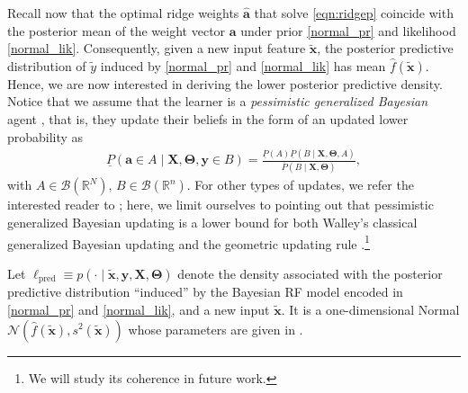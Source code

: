 \documentclass[12pt, english, oneside, a4paper]{article}
\newcommand{\y}{\boldsymbol{y}}
\newcommand{\X}{\boldsymbol{X}}
\newcommand{\x}{\boldsymbol{x}}
\renewcommand{\a}{\boldsymbol{a}}
\newcommand{\bT}{\boldsymbol{\Theta}}
\begin{document}
Recall now that the optimal ridge weights $\hat{\a}$ that solve \eqref{eqn:ridgep} coincide with the posterior mean of the weight vector $\a$ under prior \eqref{normal_pr} and likelihood \eqref{normal_lik}. Consequently, given a new input feature $\tilde{\x}$, the posterior predictive distribution of $\tilde{y}$ induced by \eqref{normal_pr} and \eqref{normal_lik} has mean $\hat f(\tilde{\x})$. Hence, we are now interested in deriving the lower posterior predictive density.
Notice that we assume that the learner is a {\em pessimistic generalized Bayesian} agent \citep[Theorem 6.4.6]{walley}, that is, they update their beliefs in the form of an updated lower probability as
\begin{align}\label{pessim-gen-bayes}
    \underline{P}(\a \in A \mid \X,\bT,\y\in B)=\frac{\underline{P}(A) \underline{P}(B \mid \X,\bT,A)}{\overline{P}(B \mid \X,\bT)},
\end{align}
with $A \in \mathcal{B}(\mathbb{R}^N) \text{, } B \in \mathcal{B}(\mathbb{R}^n)$. For other types of updates, we refer the interested reader to \citet{walley,gong,teddy_me}; here, we limit ourselves to pointing out that pessimistic generalized Bayesian updating is a lower bound for both Walley’s classical generalized Bayesian updating \citep{walley} and the geometric updating rule \citep{suppes-zanotti}.\footnote{We will study its coherence \citep[Section 2.5]{walley} in future work.}

Let $\ell_\text{pred} \equiv p(\cdot \mid \tilde{\x},\y,\X,\bT)$ denote the density associated with the posterior predictive distribution ``induced'' by the Bayesian RF model encoded in \eqref{normal_pr} and \eqref{normal_lik}, and a new input $\tilde{\x}$. It is a one-dimensional Normal $\mathcal{N}(\hat{f}(\tilde{\x}),s^2(\tilde{\x}))$ whose parameters are given in \citet[Section 2.2]{baek2023asymptotics}.

\end{document}
